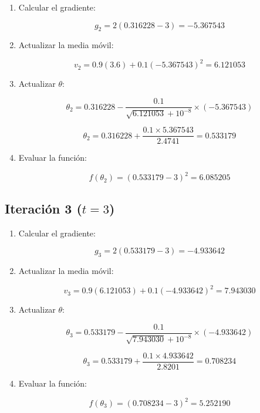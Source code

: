 \documentclass{article}
\begin{document}
\begin{enumerate}
	\item Calcular el gradiente:
	
	\[
	g_2 = 2(0.316228 - 3) = -5.367543
	\]
	
	\item Actualizar la media móvil:
	
	\[
	v_2 = 0.9(3.6) + 0.1(-5.367543)^2 = 6.121053
	\]
	
	\item Actualizar \( \theta \):
	
	\[
	\theta_2 = 0.316228 - \frac{0.1}{\sqrt{6.121053} + 10^{-8}} \times (-5.367543)
	\]
	
	\[
	\theta_2 = 0.316228 + \frac{0.1 \times 5.367543}{2.4741} = 0.533179
	\]
	
	\item Evaluar la función:
	
	\[
	f(\theta_2) = (0.533179 - 3)^2 = 6.085205
	\]
\end{enumerate}

\subsection*{Iteración 3 (\( t = 3 \))}

\begin{enumerate}
	\item Calcular el gradiente:
	
	\[
	g_3 = 2(0.533179 - 3) = -4.933642
	\]
	
	\item Actualizar la media móvil:
	
	\[
	v_3 = 0.9(6.121053) + 0.1(-4.933642)^2 = 7.943030
	\]
	
	\item Actualizar \( \theta \):
	
	\[
	\theta_3 = 0.533179 - \frac{0.1}{\sqrt{7.943030} + 10^{-8}} \times (-4.933642)
	\]
	
	\[
	\theta_3 = 0.533179 + \frac{0.1 \times 4.933642}{2.8201} = 0.708234
	\]
	
	\item Evaluar la función:
	
	\[
	f(\theta_3) = (0.708234 - 3)^2 = 5.252190
	\]
\end{enumerate}
	
\end{document}

